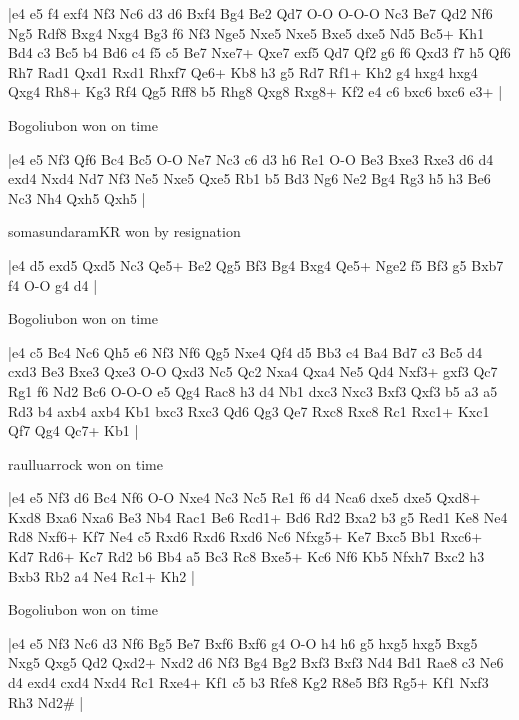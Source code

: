 \makegametitle
|e4 e5 f4 exf4 Nf3 Nc6 d3 d6 Bxf4 Bg4 Be2 Qd7 O-O O-O-O Nc3 Be7 Qd2 Nf6 Ng5 Rdf8 Bxg4 Nxg4 Bg3 f6 Nf3 Nge5 Nxe5 Nxe5 Bxe5 dxe5 Nd5 Bc5+ Kh1 Bd4 c3 Bc5 b4 Bd6 c4 f5 c5 Be7 Nxe7+ Qxe7 exf5 Qd7 Qf2 g6 f6 Qxd3 f7 h5 Qf6 Rh7 Rad1 Qxd1 Rxd1 Rhxf7 Qe6+ Kb8 h3 g5 Rd7 Rf1+ Kh2 g4 hxg4 hxg4 Qxg4 Rh8+ Kg3 Rf4 Qg5 Rff8 b5 Rhg8 Qxg8 Rxg8+ Kf2 e4 c6 bxc6 bxc6 e3+  |

\showboard

Bogoliubon won on time

\makegametitle
|e4 e5 Nf3 Qf6 Bc4 Bc5 O-O Ne7 Nc3 c6 d3 h6 Re1 O-O Be3 Bxe3 Rxe3 d6 d4 exd4 Nxd4 Nd7 Nf3 Ne5 Nxe5 Qxe5 Rb1 b5 Bd3 Ng6 Ne2 Bg4 Rg3 h5 h3 Be6 Nc3 Nh4 Qxh5 Qxh5  |

\showboard

somasundaramKR won by resignation

\makegametitle
|e4 d5 exd5 Qxd5 Nc3 Qe5+ Be2 Qg5 Bf3 Bg4 Bxg4 Qe5+ Nge2 f5 Bf3 g5 Bxb7 f4 O-O g4 d4  |

\showboard

Bogoliubon won on time

\makegametitle
|e4 c5 Bc4 Nc6 Qh5 e6 Nf3 Nf6 Qg5 Nxe4 Qf4 d5 Bb3 c4 Ba4 Bd7 c3 Bc5 d4 cxd3 Be3 Bxe3 Qxe3 O-O Qxd3 Nc5 Qc2 Nxa4 Qxa4 Ne5 Qd4 Nxf3+ gxf3 Qc7 Rg1 f6 Nd2 Bc6 O-O-O e5 Qg4 Rac8 h3 d4 Nb1 dxc3 Nxc3 Bxf3 Qxf3 b5 a3 a5 Rd3 b4 axb4 axb4 Kb1 bxc3 Rxc3 Qd6 Qg3 Qe7 Rxc8 Rxc8 Rc1 Rxc1+ Kxc1 Qf7 Qg4 Qc7+ Kb1  |

\showboard

raulluarrock won on time

\makegametitle
|e4 e5 Nf3 d6 Bc4 Nf6 O-O Nxe4 Nc3 Nc5 Re1 f6 d4 Nca6 dxe5 dxe5 Qxd8+ Kxd8 Bxa6 Nxa6 Be3 Nb4 Rac1 Be6 Rcd1+ Bd6 Rd2 Bxa2 b3 g5 Red1 Ke8 Ne4 Rd8 Nxf6+ Kf7 Ne4 c5 Rxd6 Rxd6 Rxd6 Nc6 Nfxg5+ Ke7 Bxc5 Bb1 Rxc6+ Kd7 Rd6+ Kc7 Rd2 b6 Bb4 a5 Bc3 Rc8 Bxe5+ Kc6 Nf6 Kb5 Nfxh7 Bxc2 h3 Bxb3 Rb2 a4 Ne4 Rc1+ Kh2  |

\showboard

Bogoliubon won on time

\makegametitle
|e4 e5 Nf3 Nc6 d3 Nf6 Bg5 Be7 Bxf6 Bxf6 g4 O-O h4 h6 g5 hxg5 hxg5 Bxg5 Nxg5 Qxg5 Qd2 Qxd2+ Nxd2 d6 Nf3 Bg4 Bg2 Bxf3 Bxf3 Nd4 Bd1 Rae8 c3 Ne6 d4 exd4 cxd4 Nxd4 Rc1 Rxe4+ Kf1 c5 b3 Rfe8 Kg2 R8e5 Bf3 Rg5+ Kf1 Nxf3 Rh3 Nd2\#  |

